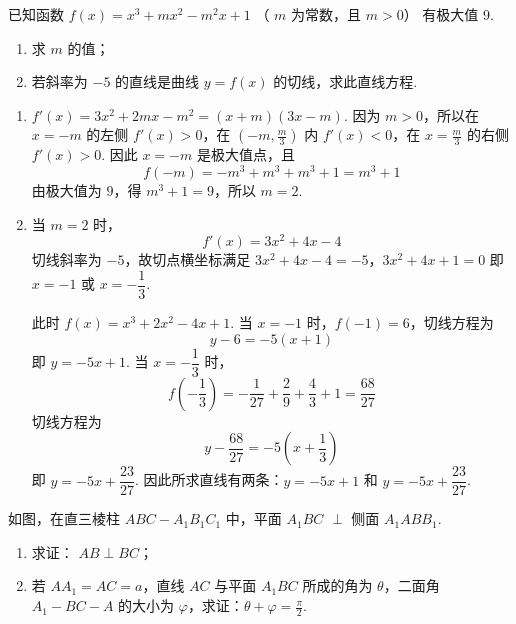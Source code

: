 \begin{problem}
已知函数 \( f(x) = x^3 + mx^2 - m^2x + 1 \) （ \( m \) 为常数，且 \( m > 0 \)） 有极大值 9.
\begin{enumerate}
\item 求 \( m \) 的值；
\item 若斜率为 \(-5\) 的直线是曲线 \( y = f(x) \) 的切线，求此直线方程.
\end{enumerate}
\end{problem}

\begin{solution}
\begin{enumerate}
\item \(f'(x)=3x^2+2mx-m^2=(x+m)(3x-m)\). 因为 \(m>0\)，所以在 \(x=-m\) 的左侧 \(f'(x)>0\)，在 \((-m,\frac{m}{3})\) 内 \(f'(x)<0\)，在 \(x=\frac{m}{3}\) 的右侧 \(f'(x)>0\). 因此 \(x=-m\) 是极大值点，且
\[
f(-m)=-m^3+m^3+m^3+1=m^3+1
\]
由极大值为 \(9\)，得 \(m^3+1=9\)，所以 \(m=2\).

\item 当 \(m=2\) 时，
\[
f'(x)=3x^2+4x-4
\]
切线斜率为 \(-5\)，故切点横坐标满足
\(3x^2+4x-4=-5\)，\(3x^2+4x+1=0\)
即 \(x=-1\) 或 \(x=-\dfrac{1}{3}\).

此时 \(f(x)=x^3+2x^2-4x+1\). 当 \(x=-1\) 时，\(f(-1)=6\)，切线方程为
\[
y-6=-5(x+1)
\]
即 \(y=-5x+1\). 当 \(x=-\dfrac{1}{3}\) 时，
\[
f\left(-\frac{1}{3}\right)=-\frac{1}{27}+\frac{2}{9}+\frac{4}{3}+1=\frac{68}{27}
\]
切线方程为
\[
y-\frac{68}{27}=-5\left(x+\frac{1}{3}\right)
\]
即 \(y=-5x+\dfrac{23}{27}\). 因此所求直线有两条：\(y=-5x+1\) 和 \(y=-5x+\dfrac{23}{27}\).
\end{enumerate}
\end{solution}

\begin{problem}
如图，在直三棱柱 \(ABC - A_{1}B_{1}C_{1}\) 中，平面 \(A_{1}BC\) \(\perp\) 侧面 \(A_{1}ABB_{1}\).
\begin{enumerate}
\item 求证： \(AB \perp BC\)；
\item 若 \(AA_{1} = AC = a\)，直线 \(AC\) 与平面 \(A_{1}BC\) 所成的角为 \(\theta\)，二面角 \(A_{1} - BC - A\) 的大小为 \(\varphi\)，求证：\(\theta + \varphi = \frac{\pi}{2}\).
\end{enumerate}

\end{problem}

